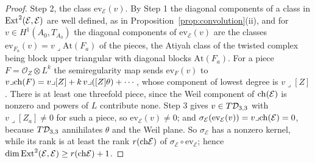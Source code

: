 \begin{proof}
Step 2, the class $\mathrm{ev}_{\mathcal{E}}(v)$. By Step 1 the diagonal components of a class in $\mathrm{Ext}^{2}(\mathcal{E},\mathcal{E})$ are well defined, as in Proposition~\ref{prop:convolution}(ii), and for $v\in H^{1}(A_{0},T_{A_{0}})$ the diagonal components of $\mathrm{ev}_{\mathcal{E}}(v)$ are the classes $\mathrm{ev}_{F_{a}}(v)=v\lrcorner\mathrm{At}(F_{a})$ of the pieces, the Atiyah class of the twisted complex being block upper triangular with diagonal blocks $\mathrm{At}(F_{a})$. For a piece $F=\mathcal{O}_{Z}\otimes L^{k}$ the semiregularity map sends $\mathrm{ev}_{F}(v)$ to $v\lrcorner\mathrm{ch}(F)=v\lrcorner[Z]+k\,v\lrcorner([Z]\theta)+\cdots$, whose component of lowest degree is $v\lrcorner[Z]$. There is at least one threefold piece, since the Weil component of $\mathrm{ch}(\mathcal{E})$ is nonzero and powers of $L$ contribute none. Step 3 gives $v\in T\mathcal{D}_{3,3}$ with $v\lrcorner[Z_{a}]\ne0$ for such a piece, so $\mathrm{ev}_{\mathcal{E}}(v)\ne0$; and $\sigma_{\mathcal{E}}(\mathrm{ev}_{\mathcal{E}}(v))=v\lrcorner\mathrm{ch}(\mathcal{E})=0$, because $T\mathcal{D}_{3,3}$ annihilates $\theta$ and the Weil plane. So $\sigma_{\mathcal{E}}$ has a nonzero kernel, while its rank is at least the rank $r(\mathrm{ch}\mathcal{E})$ of $\sigma_{\mathcal{E}}\circ\mathrm{ev}_{\mathcal{E}}$; hence $\dim\mathrm{Ext}^{2}(\mathcal{E},\mathcal{E})\ge r(\mathrm{ch}\mathcal{E})+1$.


\end{proof}
